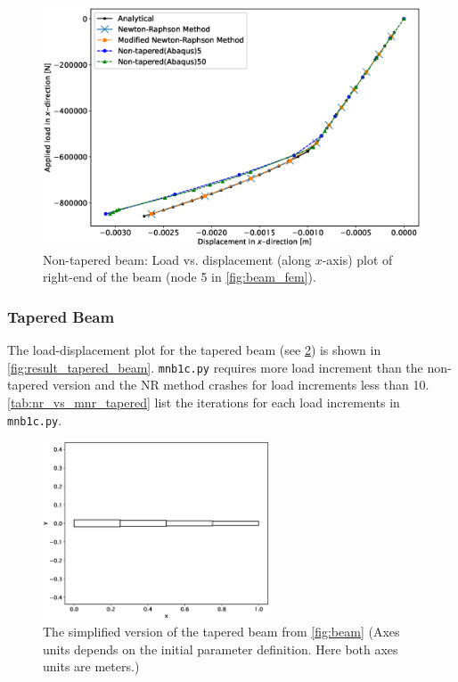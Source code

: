 \documentclass{article}
\begin{document}
\begin{figure}[H]
    \centering
    \includegraphics[width = 1\textwidth ]{figures/comparison_non_tapered.eps}
    \caption{Non-tapered beam: Load vs. displacement (along $x$-axis) plot of right-end of the beam (node 5 in \cref{fig:beam_fem}).}
    \label{fig:result_non_tapered_beam}
\end{figure}

\subsubsection{Tapered Beam}
The load-displacement plot for the tapered beam (see \cref{fig:tapered_beam}) is shown in \cref{fig:result_tapered_beam}.  \texttt{mnb1c.py} requires more load increment than the non-tapered version and the NR method crashes for load increments less than 10. \cref{tab:nr_vs_mnr_tapered} list the iterations for each load increments in \texttt{mnb1c.py}.

\begin{figure}[H]
    \centering
    \includegraphics[width = 0.6\textwidth ]{figures/tapered_beam.eps}
    \caption{The simplified version of the tapered beam from \cref{fig:beam} (Axes units depends on the initial parameter definition. Here both axes units are meters.)}
    \label{fig:tapered_beam}
\end{figure}
\end{document}
